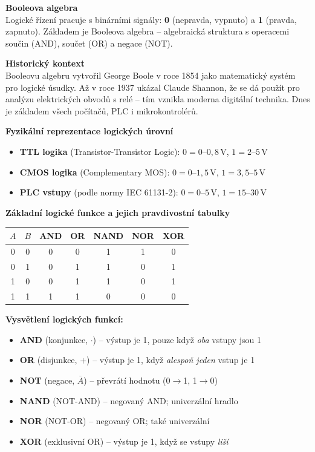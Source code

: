 \documentclass[a4paper,10pt]{article}
\begin{document}
\begin{vysvetlenibox}
\textbf{Booleova algebra}\\
Logické řízení pracuje s binárními signály: \textbf{0} (nepravda, vypnuto)
a \textbf{1} (pravda, zapnuto). Základem je Booleova algebra -- algebraická
struktura s operacemi součin (AND), součet (OR) a negace (NOT).

\textbf{Historický kontext}\\
Booleovu algebru vytvořil George Boole v roce 1854 jako matematický systém
pro logické úsudky. Až v roce 1937 ukázal Claude Shannon, že se dá použít
pro analýzu elektrických obvodů s relé -- tím vznikla moderna digitální
technika. Dnes je základem všech počítačů, PLC i mikrokontrolérů.

\textbf{Fyzikální reprezentace logických úrovní}
\begin{itemize}[noitemsep, leftmargin=1.4em, topsep=4pt]
    \item \textbf{TTL logika} (Transistor-Transistor Logic):
          $0 = 0\text{--}0{,}8\,\text{V}$, $1 = 2\text{--}5\,\text{V}$
    \item \textbf{CMOS logika} (Complementary MOS):
          $0 = 0\text{--}1{,}5\,\text{V}$, $1 = 3{,}5\text{--}5\,\text{V}$
    \item \textbf{PLC vstupy} (podle normy IEC 61131-2):
          $0 = 0\text{--}5\,\text{V}$, $1 = 15\text{--}30\,\text{V}$
\end{itemize}

\textbf{Základní logické funkce a jejich pravdivostní tabulky}

\begin{center}
\begin{tabular}{cc|c|c|c|c|c}
    \toprule
    $A$ & $B$ & AND & OR & NAND & NOR & XOR \\
    \midrule
    0 & 0 & 0 & 0 & 1 & 1 & 0 \\
    0 & 1 & 0 & 1 & 1 & 0 & 1 \\
    1 & 0 & 0 & 1 & 1 & 0 & 1 \\
    1 & 1 & 1 & 1 & 0 & 0 & 0 \\
    \bottomrule
\end{tabular}
\end{center}

\textbf{Vysvětlení logických funkcí:}
\begin{itemize}[noitemsep, leftmargin=1.4em, topsep=4pt]
    \item \textbf{AND} (konjunkce, $\cdot$) -- výstup je 1, pouze když \textit{oba} vstupy jsou 1
    \item \textbf{OR} (disjunkce, $+$) -- výstup je 1, když \textit{alespoň jeden} vstup je 1
    \item \textbf{NOT} (negace, $\overline{A}$) -- převrátí hodnotu (0$\to$1, 1$\to$0)
    \item \textbf{NAND} (NOT-AND) -- negovaný AND; univerzální hradlo
    \item \textbf{NOR} (NOT-OR) -- negovaný OR; také univerzální
    \item \textbf{XOR} (exklusivní OR) -- výstup je 1, když se vstupy \textit{liší}
\end{itemize}


\end{vysvetlenibox}
\end{document}
